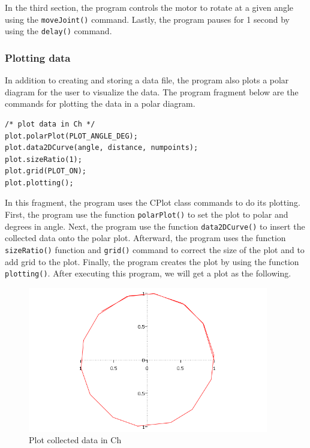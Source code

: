 \documentclass[11pt]{article}
\begin{document}
In the third section, the program controls the motor to rotate at a given angle 
using the {\tt moveJoint()} command. Lastly, the program pauses for 1 second by 
using the {\tt delay()} command.

\subsubsection*{Plotting data}
In addition to creating and storing a data file, the program also plots a polar 
diagram for the user to visualize the data. The program fragment below are the 
commands for plotting the data in a polar diagram.
\begin{lstlisting}
/* plot data in Ch */
plot.polarPlot(PLOT_ANGLE_DEG);
plot.data2DCurve(angle, distance, numpoints);
plot.sizeRatio(1);
plot.grid(PLOT_ON); 
plot.plotting();
\end{lstlisting}
In this fragment, the program uses the CPlot class commands to do its plotting.
First, the program use the function {\tt polarPlot()} to set the plot to polar 
and degrees in angle. Next, the program use the function {\tt data2DCurve()} to 
insert the collected data onto the polar plot. Afterward, the program uses the 
function {\tt sizeRatio()} function and {\tt grid()} command to correct the size 
of the plot and to add grid to the plot. Finally, the program creates the plot 
by using the function {\tt plotting()}. After executing this program, we will get
a plot as the following.
\begin{figure}[h!]
    \begin{center}
    \includegraphics[height=2.5in]{figure/mindstorm/plotData.png}
    \caption{Plot collected data in Ch\label{fig_plot_data}}
\end{center}
\end{figure}
\end{document}
